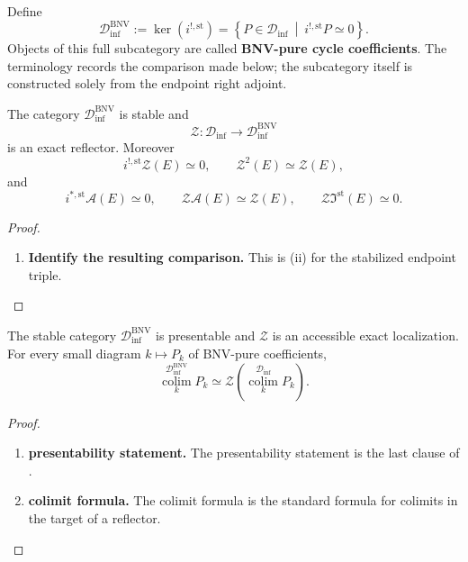 \begin{definition}
\label{def:stable-bnv-pure-cycle}
Define
\[
    \mathcal D_{\inf}^{\mathrm{BNV}}
    :=
    \ker(i^{!,\mathrm{st}})
    =
    \left\{
        P\in\mathcal D_{\inf}
        \ \middle|\
        i^{!,\mathrm{st}}P\simeq0
    \right\}.
\]
Objects of this full subcategory are called \textbf{BNV-pure cycle
coefficients}. The terminology records the comparison made below; the
subcategory itself is constructed solely from the endpoint right adjoint.
\end{definition}

\begin{proposition}
\label{prop:stable-bnv-cycle-reflector}
The category \(\mathcal D_{\inf}^{\mathrm{BNV}}\) is stable and
\[
    \mathcal Z:
    \mathcal D_{\inf}\longrightarrow\mathcal D_{\inf}^{\mathrm{BNV}}
\]
is an exact reflector. Moreover
\[
    i^{!,\mathrm{st}}\mathcal Z(E)\simeq0,
    \qquad
    \mathcal Z^2(E)\simeq\mathcal Z(E),
\]
and
\[
\boxed{
    i^{*,\mathrm{st}}\mathcal A(E)\simeq0,
    \qquad
    \mathcal Z\mathcal A(E)\simeq\mathcal Z(E),
    \qquad
    \mathcal Z\Im^{\mathrm{st}}(E)\simeq0.
}
\]
\end{proposition}

\begin{proof}
\leavevmode
\begin{enumerate}[label=\textup{(\arabic*)}]
    \item \textbf{Identify the resulting comparison.}
    This is \textup{(ii)} for the stabilized endpoint triple.
\end{enumerate}
\end{proof}

\begin{proposition}
\label{prop:stable-bnv-pure-presentable}
The stable category \(\mathcal D_{\inf}^{\mathrm{BNV}}\) is presentable and
\(\mathcal Z\) is an accessible exact localization. For every small diagram
\(k\mapsto P_k\) of BNV-pure coefficients,
\[
    \operatorname*{colim}^{\mathcal D_{\inf}^{\mathrm{BNV}}}_kP_k
    \simeq
    \mathcal Z\left(
        \operatorname*{colim}^{\mathcal D_{\inf}}_kP_k
    \right).
\]
\end{proposition}

\begin{proof}
\leavevmode
\begin{enumerate}[label=\textup{(\arabic*)}]
    \item \textbf{presentability statement.}
    The presentability statement is the last clause of .

    \item \textbf{colimit formula.}
    The colimit formula is the standard formula for colimits in the target of a reflector.
\end{enumerate}
\end{proof}

